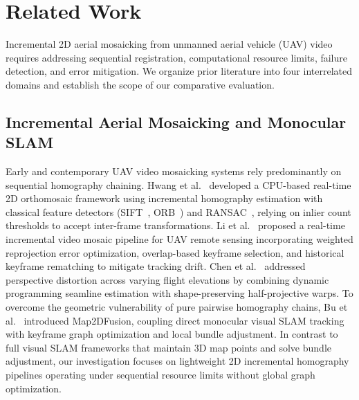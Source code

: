 \section{Related Work}
\label{sec:related_work}

Incremental 2D aerial mosaicking from unmanned aerial vehicle (UAV) video requires addressing sequential registration, computational resource limits, failure detection, and error mitigation. We organize prior literature into four interrelated domains and establish the scope of our comparative evaluation.

\subsection{Incremental Aerial Mosaicking and Monocular SLAM}
Early and contemporary UAV video mosaicking systems rely predominantly on sequential homography chaining. Hwang et al.~\cite{hwang2026} developed a CPU-based real-time 2D orthomosaic framework using incremental homography estimation with classical feature detectors (SIFT~\cite{lowe2004}, ORB~\cite{rublee2011}) and RANSAC~\cite{fischler1981}, relying on inlier count thresholds to accept inter-frame transformations. Li et al.~\cite{li2023} proposed a real-time incremental video mosaic pipeline for UAV remote sensing incorporating weighted reprojection error optimization, overlap-based keyframe selection, and historical keyframe rematching to mitigate tracking drift. Chen et al.~\cite{chen2022} addressed perspective distortion across varying flight elevations by combining dynamic programming seamline estimation with shape-preserving half-projective warps. To overcome the geometric vulnerability of pure pairwise homography chains, Bu et al.~\cite{map2dfusion} introduced Map2DFusion, coupling direct monocular visual SLAM tracking with keyframe graph optimization and local bundle adjustment. In contrast to full visual SLAM frameworks that maintain 3D map points and solve bundle adjustment, our investigation focuses on lightweight 2D incremental homography pipelines operating under sequential resource limits without global graph optimization.

